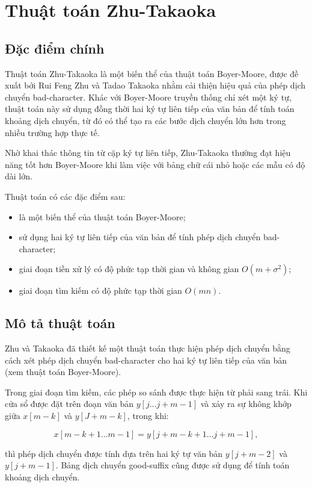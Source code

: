 \section{Thuật toán Zhu-Takaoka}

\subsection{Đặc điểm chính}
Thuật toán Zhu-Takaoka là một biến thể của thuật toán Boyer-Moore, được đề xuất bởi Rui Feng Zhu và Tadao Takaoka nhằm cải thiện hiệu quả của phép dịch chuyển bad-character. Khác với Boyer-Moore truyền thống chỉ xét một ký tự, thuật toán này sử dụng đồng thời hai ký tự liên tiếp của văn bản để tính toán khoảng dịch chuyển, từ đó có thể tạo ra các bước dịch chuyển lớn hơn trong nhiều trường hợp thực tế.

Nhờ khai thác thông tin từ cặp ký tự liên tiếp, Zhu-Takaoka thường đạt hiệu năng tốt hơn Boyer-Moore khi làm việc với bảng chữ cái nhỏ hoặc các mẫu có độ dài lớn.

Thuật toán có các đặc điểm sau:
\begin{itemize}
    \item là một biến thể của thuật toán Boyer-Moore;
    \item sử dụng hai ký tự liên tiếp của văn bản để tính phép dịch chuyển bad-character;
    \item giai đoạn tiền xử lý có độ phức tạp thời gian và không gian $O(m + \sigma ^ 2)$;
    \item giai đoạn tìm kiếm có độ phức tạp thời gian $O(mn)$.
\end{itemize}

\subsection{Mô tả thuật toán}
Zhu và Takaoka đã thiết kế một thuật toán thực hiện phép dịch chuyển bằng cách xét phép dịch chuyển bad-character cho hai ký tự liên tiếp của văn bản (xem thuật toán Boyer-Moore).

Trong giai đoạn tìm kiếm, các phép so sánh được thực hiện từ phải sang trái. Khi cửa sổ được đặt trên đoạn văn bản $y[j \dots j + m - 1]$ và xảy ra sự không khớp giữa $x[m - k]$ và $y[J + m - k]$, trong khi:

\[
x[m - k + 1 \dots m - 1] = y[j + m - k + 1 \dots j + m - 1],
\]

thì phép dịch chuyển được tính dựa trên hai ký tự văn bản $y[j + m - 2]$ và $y[j + m - 1]$. Bảng dịch chuyển good-suffix cũng được sử dụng để tính toán khoảng dịch chuyển.

